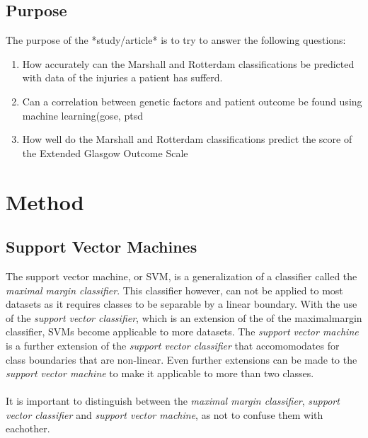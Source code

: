 \documentclass[11pt]{article}
\begin{document}
\subsection{Purpose}
The purpose of the *study/article* is to try to answer the following questions:

\begin{enumerate}
  \item{How accurately can the Marshall and Rotterdam classifications be predicted with data of the injuries a patient has sufferd.}
  \item{Can a correlation between genetic factors and patient outcome be found using machine learning(\gls{gose}, \gls{ptsd}}
  \item{How well do the Marshall and Rotterdam classifications predict the score of the Extended Glasgow Outcome Scale}
\end{enumerate}

\section{Method}
\subsection{Support Vector Machines}
The support vector machine, or SVM, is a generalization of a classifier called the \textit{maximal margin classifier}. This classifier however, can not be applied to most datasets as it requires classes to be separable by a linear boundary. With the use of the \textit{support vector classifier}, which is an extension of the of the maximalmargin classifier, SVMs become applicable to more datasets. The \textit{support vector machine} is a further extension of the \textit{support vector classifier} that accomomodates for class boundaries that are non-linear. Even further extensions can be made to the \textit{support vector machine} to make it applicable to more than two classes.\cite{jamesSupportVectorMachines}\\
\\
It is important to distinguish between the \textit{maximal margin classifier}, \textit{support vector classifier} and \textit{support vector machine}, as not to confuse them with eachother.\cite{jamesSupportVectorMachines}
\end{document}
